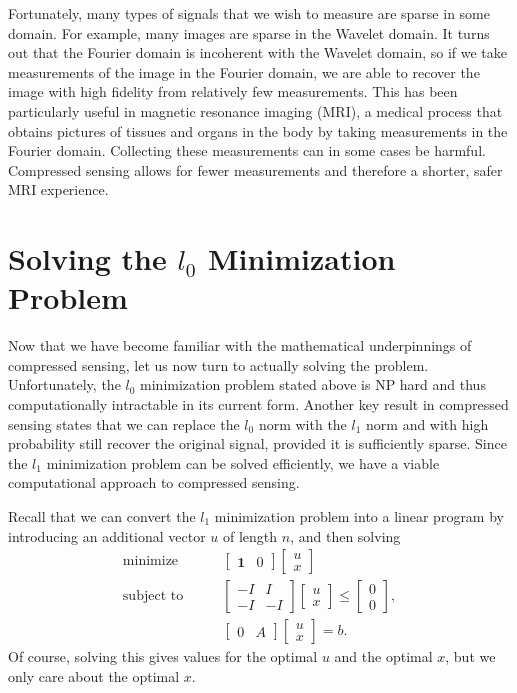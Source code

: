 Fortunately, many types of signals that we wish to measure are sparse in some domain. For example, many images
are sparse in the Wavelet domain. It turns out that the Fourier domain is incoherent with the Wavelet domain,
so if we take measurements of the image in the Fourier domain, we are able to recover the image with high 
fidelity from relatively few measurements. This has been particularly useful in magnetic resonance imaging 
(MRI), a medical process that obtains pictures of tissues and organs in the body by taking measurements in
the Fourier domain. Collecting these measurements can in some cases be harmful. Compressed sensing
allows for fewer measurements and therefore a shorter, safer MRI experience.

\section*{Solving the $l_0$ Minimization Problem}
Now that we have become familiar with the mathematical underpinnings of compressed sensing, let us now turn to 
actually solving the problem. Unfortunately, the $l_0$ minimization problem stated above is NP hard and thus 
computationally intractable in its current form. Another key result in compressed sensing states that we can
replace the $l_0$ norm with the $l_1$ norm and with high probability still recover the original signal, provided
it is sufficiently sparse. Since the $l_1$ minimization problem can be solved efficiently, we have a viable 
computational approach to compressed sensing. 

Recall that we can convert the $l_1$ minimization problem into a linear program by introducing an additional
vector $u$ of length $n$, and then solving
\begin{align*}
\text{minimize}\qquad 
&\begin{bmatrix}
\mathbf{1} & 0
\end{bmatrix}
\begin{bmatrix}
u \\
x
\end{bmatrix}\\
\text{subject to}\qquad
&\begin{bmatrix}
-I & I\\
-I & -I
\end{bmatrix}
\begin{bmatrix}
u \\
x
\end{bmatrix}
\leq 
\begin{bmatrix}
0\\
0
\end{bmatrix},\\
&\begin{bmatrix}
0 & A
\end{bmatrix}
\begin{bmatrix}
u \\
x
\end{bmatrix}
= 
b.
\end{align*}
Of course, solving this gives values for the optimal $u$ and the optimal $x$, but we only care about the optimal $x$.

